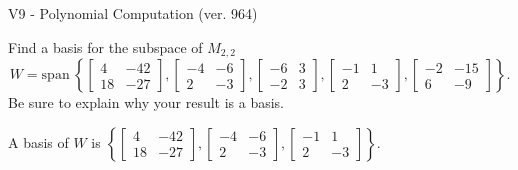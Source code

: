 \begin{exercise}
  \begin{exerciseTitle}V9 - Polynomial Computation (ver. 964)\end{exerciseTitle}
  \begin{exerciseStatement}
    Find a basis for the subspace of \(M_{2,2}\) 
\[W=\mathrm{span}\ \left\{\left[\begin{array}{cc}
4 & -42 \\
18 & -27
\end{array}\right] , \left[\begin{array}{cc}
-4 & -6 \\
2 & -3
\end{array}\right] , \left[\begin{array}{cc}
-6 & 3 \\
-2 & 3
\end{array}\right] , \left[\begin{array}{cc}
-1 & 1 \\
2 & -3
\end{array}\right] , \left[\begin{array}{cc}
-2 & -15 \\
6 & -9
\end{array}\right]\right\}.\]
 Be sure to explain why your result is a basis.


  \end{exerciseStatement}
  \begin{exerciseAnswer}
   A basis of \(W\) is  \(\left\{\left[\begin{array}{cc}
4 & -42 \\
18 & -27
\end{array}\right] , \left[\begin{array}{cc}
-4 & -6 \\
2 & -3
\end{array}\right] , \left[\begin{array}{cc}
-1 & 1 \\
2 & -3
\end{array}\right]\right\}\).
  


  \end{exerciseAnswer}
\end{exercise}
